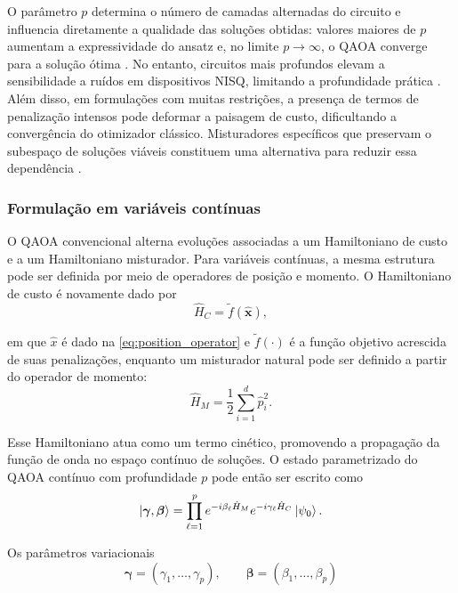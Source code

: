 O parâmetro $p$ determina o número de camadas alternadas do circuito e influencia diretamente a qualidade das soluções obtidas: valores maiores de $p$ aumentam a expressividade do ansatz e, no limite $p \to \infty$, o QAOA converge para a solução ótima \cite{farhi_quantum_2014}. No entanto, circuitos mais profundos elevam a sensibilidade a ruídos em dispositivos NISQ, limitando a profundidade prática \cite{preskill2019quantum}. Além disso, em formulações com muitas restrições, a presença de termos de penalização intensos pode deformar a paisagem de custo, dificultando a convergência do otimizador clássico. Misturadores específicos que preservam o subespaço de soluções viáveis constituem uma alternativa para reduzir essa dependência \cite{hadfield2019quantum}. 

\subsubsection{Formulação em variáveis contínuas}

O QAOA convencional alterna evoluções associadas a um Hamiltoniano de custo e a um Hamiltoniano misturador. Para variáveis contínuas, a mesma estrutura pode ser definida por meio de operadores de posição e momento. O Hamiltoniano de custo é novamente dado por
\begin{equation}
    \hat{H}_C = \widetilde{f}(\hat{\mathbf{x}}),
    \label{eq:cv_qaoa_cost}
\end{equation}

\noindent em que $\hat{x}$ é dado na \autoref{eq:position_operator} e $\widetilde{f}(\cdot)$ é a função objetivo acrescida de suas penalizações, enquanto um misturador natural pode ser definido a partir do operador de momento:
\begin{equation}
    \hat{H}_M
    =
    \frac{1}{2}
    \sum_{i=1}^{d}
    \hat{p}_i^2.
    \label{eq:cv_qaoa_mixer}
\end{equation}

Esse Hamiltoniano atua como um termo cinético, promovendo a propagação da função de onda no espaço contínuo de soluções. O estado parametrizado do QAOA contínuo com profundidade $p$ pode então ser escrito como
\begin{equation}
    \ket{\boldsymbol{\gamma},\boldsymbol{\beta}}
    =
    \prod_{\ell=1}^{p}
    e^{-i\beta_{\ell}\hat{H}_M}
    e^{-i\gamma_{\ell}\hat{H}_C}
    \ket{\psi_0}.
    \label{eq:cv_qaoa_state}
\end{equation}

Os parâmetros variacionais
\begin{equation}
    \boldsymbol{\gamma} = (\gamma_1,\ldots,\gamma_p),
    \qquad
    \boldsymbol{\beta} = (\beta_1,\ldots,\beta_p)
\end{equation}

